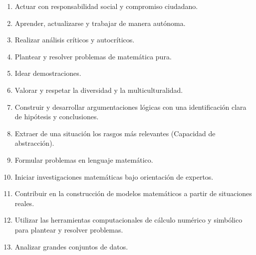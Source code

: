 \documentclass[a4paper, 12pt]{article}
\begin{document}
\begin{enumerate}

\item { Actuar con responsabilidad social y compromiso
ciudadano}.

\item {Aprender, actualizarse y trabajar de manera autónoma}. 
 


\item {Realizar análisis  críticos y autocríticos}. 
 
\item {Plantear y resolver problemas de matemática pura}. 

\item{Idear demostraciones}.

\item {Valorar y respetar  la diversidad
y la multiculturalidad}. 
 




 

\item {Construir y desarrollar
argumentaciones lógicas con una
identificación clara de hipótesis y conclusiones}. 
 
\item {Extraer   de una situación los rasgos más relevantes (Capacidad de abstracción)}. 
 


\item {Formular problemas
en lenguaje matemático}. 
 

  


\item {Iniciar investigaciones
matemáticas bajo orientación de expertos.} 
 


 
 


\item {Contribuir en la
construcción de modelos matemáticos a
partir de situaciones reales}. 
 


\item {Utilizar las herramientas
computacionales de cálculo numérico
y simbólico para plantear y resolver
problemas.} 
 


\item {Analizar  grandes conjuntos de datos.} 
 



\end{enumerate}
\end{document}
